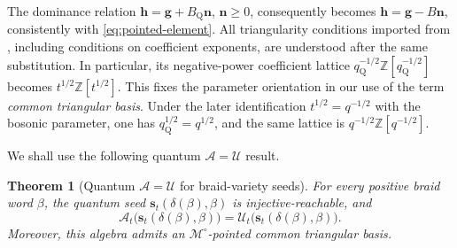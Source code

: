 \documentclass[12pt, reqno]{amsart}
\theoremstyle{plain}
\newtheorem{theorem}{Theorem}[section]
\theoremstyle{definition}
\numberwithin{equation}{section}
\newcommand{\ZZ}{\mathbb{Z}}
\begin{document}
The dominance relation
\(\mathbf h=\mathbf g+B_{\mathrm Q}\mathbf n\),
\(\mathbf n\geq0\), consequently becomes
\(\mathbf h=\mathbf g-B\mathbf n\), consistently with
\eqref{eq:pointed-element}. All triangularity conditions imported
from \cite{qin2024analogs}, including conditions on coefficient
exponents, are understood after the same substitution. In
particular, its negative-power coefficient lattice
\(q_{\mathrm Q}^{-1/2}\ZZ[q_{\mathrm Q}^{-1/2}]\) becomes
\(t^{1/2}\ZZ[t^{1/2}]\). This fixes the parameter orientation in
our use of the term \emph{common triangular basis}. Under the later
identification \(t^{1/2}=q^{-1/2}\) with the bosonic parameter,
one has \(q_{\mathrm Q}^{1/2}=q^{1/2}\), and the same lattice is
\(q^{-1/2}\ZZ[q^{-1/2}]\).

We shall use the following quantum \(\mathcal A=\mathcal U\) result.

\begin{theorem}[Quantum \(\mathcal A=\mathcal U\) for braid-variety seeds]
\label{thm:quantum-A-U-braid-seeds}
For every positive braid word \(\beta\), the quantum seed
\(\mathbf s_t(\delta(\beta),\beta)\) is injective-reachable, and
\begin{equation}\label{eq:quantum-A-U-braid-seeds}
    \mathcal A_t\bigl(
        \mathbf s_t(\delta(\beta),\beta)
    \bigr)
    =
    \mathcal U_t\bigl(
        \mathbf s_t(\delta(\beta),\beta)
    \bigr).
\end{equation}
Moreover, this algebra admits an
\(\mathcal M^\circ\)-pointed common triangular basis.
\end{theorem}
\end{document}
